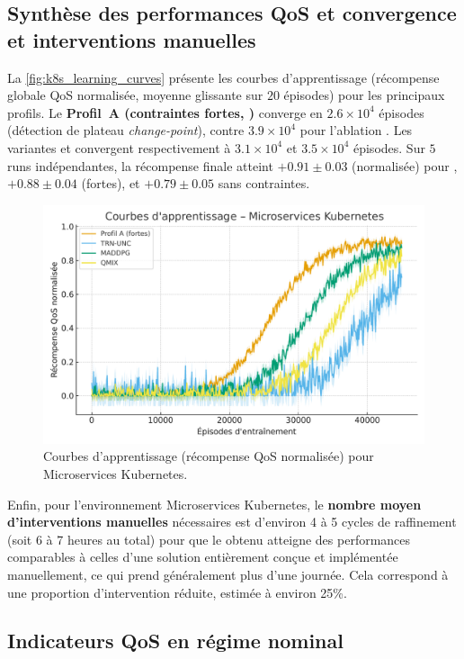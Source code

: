 \subsection*{Synthèse des performances QoS et convergence et interventions manuelles}

La \autoref{fig:k8s_learning_curves} présente les courbes d'apprentissage (récompense globale QoS normalisée, moyenne glissante sur $20$ épisodes) pour les principaux profils.
Le \textbf{Profil~A (contraintes fortes, )} converge en $2.6\times 10^4$ épisodes (détection de plateau \emph{change-point}), contre $3.9\times 10^4$ pour l'ablation .
Les variantes  et  convergent respectivement à $3.1\times 10^4$ et $3.5\times 10^4$ épisodes.
Sur $5$ runs indépendantes, la récompense finale atteint $+0.91 \pm 0.03$ (normalisée) pour , $+0.88 \pm 0.04$ (fortes), et $+0.79 \pm 0.05$ sans contraintes.

\begin{figure}[h!]
  \centering
  \includegraphics[width=0.75\linewidth]{figures/results_k8s_learning.pdf}
  \caption[Courbes d'apprentissage (récompense QoS normalisée) pourMicroservices Kubernetes]{Courbes d'apprentissage (récompense QoS normalisée) pour Microservices Kubernetes.}
  \label{fig:k8s_learning_curves}
\end{figure}

Enfin, pour l'environnement Microservices Kubernetes, le \textbf{nombre moyen d'interventions manuelles} nécessaires est d'environ 4 à 5 cycles de raffinement (soit 6 à 7 heures au total) pour que le  obtenu atteigne des performances comparables à celles d'une solution entièrement conçue et implémentée manuellement, ce qui prend généralement plus d'une journée. Cela correspond à une proportion d'intervention réduite, estimée à environ 25\%.

\subsection*{Indicateurs QoS en régime nominal}

